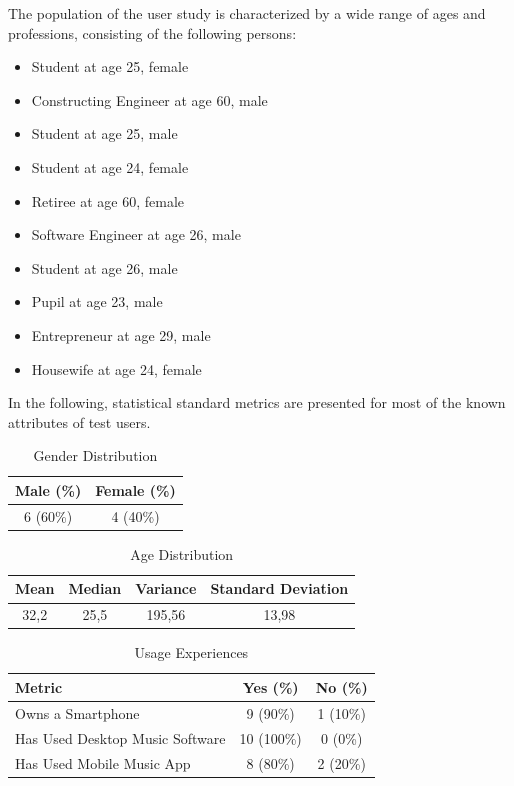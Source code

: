 The population of the user study is characterized by a wide range of ages and professions, consisting of the following persons:

\begin{itemize}
	\item Student at age 25, female
	\item Constructing Engineer at age 60, male
	\item Student at age 25, male
	\item Student at age 24, female
	\item Retiree at age 60, female
	\item Software Engineer at age 26, male
	\item Student at age 26, male
	\item Pupil at age 23, male
	\item Entrepreneur at age 29, male
	\item Housewife at age 24, female
\end{itemize}

In the following, statistical standard metrics are presented for most of the known attributes of test users.

\begin{table}[H]
\begin{center}
\begin{tabular}{ | c | c | }
	\hline
	\textbf{Male (\%)} & \textbf{Female (\%)} \\ \hline
	6 (60\%) & 4 (40\%) \\ \hline
\end{tabular}
\caption {Gender Distribution} \label{tab:gender} 
\end{center}
\end{table}

\begin{table}[H]
\begin{center}
\begin{tabular}{ | c | c | c | c | }
	\hline
	\textbf{Mean} & \textbf{Median} & \textbf{Variance} & \textbf{Standard Deviation} \\ \hline
	32,2 & 25,5 & 195,56 & 13,98 \\ \hline
\end{tabular}
\caption {Age Distribution} \label{tab:age-distribution} 
\end{center}
\end{table}

\begin{table}[H]
\begin{center}
\begin{tabular}{ | l | c | c | }
	\hline
	\textbf{Metric} & \textbf{Yes (\%)} & \textbf{No (\%)} \\ \hline
	Owns a Smartphone & 9 (90\%) & 1 (10\%) \\ \hline
	Has Used Desktop Music Software & 10 (100\%) & 0 (0\%) \\ \hline
	Has Used Mobile Music App & 8 (80\%) & 2 (20\%) \\ \hline
\end{tabular}
\caption {Usage Experiences} \label{tab:usage-experiences} 
\end{center}
\end{table}

